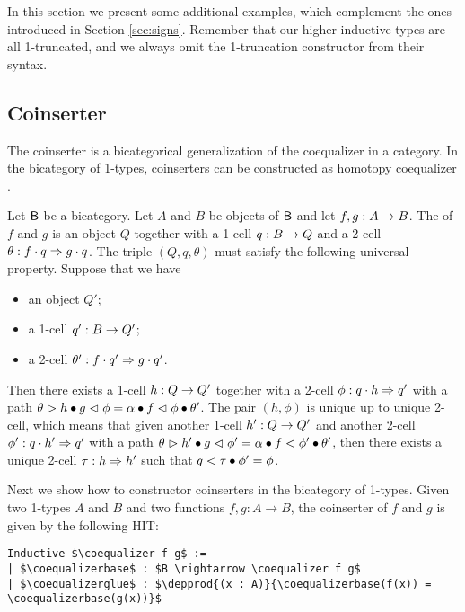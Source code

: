 In this section we present some additional examples, which complement the
ones introduced in Section \ref{sec:signs}. Remember that our higher
inductive types are all 1-truncated, and we always omit the 1-truncation
constructor from their syntax.

\subsection{Coinserter}
\label{sec:coinserter}

The coinserter is a bicategorical generalization of the coequalizer in
a category. In the bicategory of 1-types, coinserters can be constructed as
 homotopy coequalizer \cite[Chapter 6]{hottbook}.

\begin{definition}
Let $\B$ be a bicategory. Let $A$ and $B$ be objects of $\B$ and let
$f,g : A \onecell B$. The  of $f$ and $g$ is an
object $Q$ together with a 1-cell $q : B \onecell Q$ and a 2-cell
$\theta : f \cdot q\twocell g \cdot q$.
The triple $(Q,q,\theta)$ must satisfy the following universal
property. Suppose that we have
\begin{itemize}
\item an object $Q'$;
\item a 1-cell $q' : B \onecell Q'$;
\item a 2-cell $\theta' : f \cdot q' \twocell g \cdot q'$.
\end{itemize}
Then there exists a 1-cell $h : Q \onecell Q'$ together with a 2-cell
$\phi : q \cdot h \twocell q'$ with a path $\theta \whiskerr h \vcomp
g \whiskerl \phi = \lassoc{f}{q}{h} \vcomp f \whiskerl \phi \vcomp
\theta'$. The pair $(h,\phi)$ is unique up to unique 2-cell, which means that
given another 1-cell $h' : Q \onecell Q'$ and another 2-cell $\phi' :
q \cdot h' \twocell q'$ with a path $\theta \whiskerr h' \vcomp g
\whiskerl \phi' = \lassoc{f}{q}{h'} \vcomp f \whiskerl \phi' \vcomp
\theta'$, then there exists a unique 2-cell $\tau : h
\twocell h'$ such that $q \whiskerl \tau \vcomp \phi' = \phi$.
\end{definition}

Next we show how to constructor coinserters in the bicategory of 1-types.  Given two 1-types $A$ and $B$ and two
functions $f , g: A \to B$, the coinserter of $f$ and $g$ is
given by the following HIT:
\begin{lstlisting}[mathescape=true]
Inductive $\coequalizer f g$ :=
| $\coequalizerbase$ : $B \rightarrow \coequalizer f g$
| $\coequalizerglue$ : $\depprod{(x : A)}{\coequalizerbase(f(x)) = \coequalizerbase(g(x))}$
\end{lstlisting}

